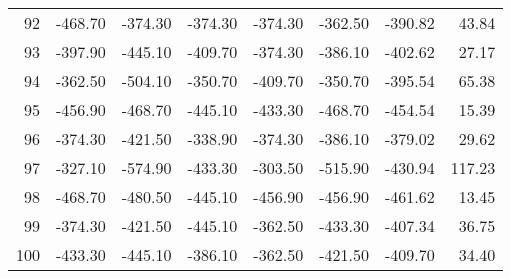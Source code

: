 \begin{longtable}{rrrrrrrr}
92 & -468.70 & -374.30 & -374.30 & -374.30 & -362.50 & -390.82 & 43.84  \\
93 & -397.90 & -445.10 & -409.70 & -374.30 & -386.10 & -402.62 & 27.17  \\
94 & -362.50 & -504.10 & -350.70 & -409.70 & -350.70 & -395.54 & 65.38  \\
95 & -456.90 & -468.70 & -445.10 & -433.30 & -468.70 & -454.54 & 15.39  \\
96 & -374.30 & -421.50 & -338.90 & -374.30 & -386.10 & -379.02 & 29.62  \\
97 & -327.10 & -574.90 & -433.30 & -303.50 & -515.90 & -430.94 & 117.23  \\
98 & -468.70 & -480.50 & -445.10 & -456.90 & -456.90 & -461.62 & 13.45  \\
99 & -374.30 & -421.50 & -445.10 & -362.50 & -433.30 & -407.34 & 36.75  \\
100 & -433.30 & -445.10 & -386.10 & -362.50 & -421.50 & -409.70 & 34.40  \\

\end{longtable}


